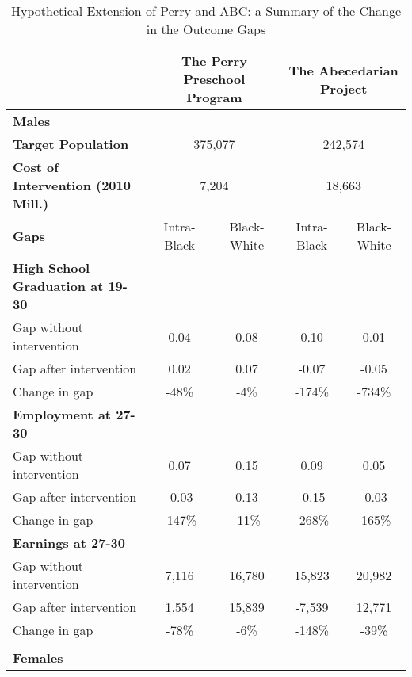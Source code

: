 \begin{table}[htbp]
\caption{\label{tab:summary} Hypothetical Extension of Perry and ABC: a Summary of the Change in the Outcome Gaps}\medskip
\footnotesize  \begin{center} \begin{tabular}{lcccc}  \hline \hline    
\textbf{ } &\multicolumn{2}{c}{The Perry Preschool Program} &\multicolumn{2}{c}{The Abecedarian Project}  \\[0.1cm]  \hline 
 \textbf{Males} & & & &  \\[0.1cm]  
\textbf{Target Population} &\multicolumn{2}{c}{     375,077} &\multicolumn{2}{c}{     242,574}  \\[0.1cm]  
\textbf{Cost of Intervention (2010 Mill.)} &\multicolumn{2}{c}{       7,204} &\multicolumn{2}{c}{      18,663}  \\[0.1cm]  
\textbf{Gaps}&Intra-Black &Black-White &Intra-Black &Black-White  \\[0.1cm] \textbf{ High School Graduation at 19-30} &&&& \\[0.02cm]  
 Gap without intervention &        0.04&        0.08&        0.10&        0.01 \\[0.02cm]   Gap after intervention &        0.02&        0.07&       -0.07&       -0.05 \\[0.02cm]   Change in gap &         -48\%&          -4\%&        -174\%&        -734\% \\[0.1cm]  \textbf{ Employment at 27-30} &&&& \\[0.02cm]  
 Gap without intervention &        0.07&        0.15&        0.09&        0.05 \\[0.02cm]   Gap after intervention &       -0.03&        0.13&       -0.15&       -0.03 \\[0.02cm]   Change in gap &        -147\%&         -11\%&        -268\%&        -165\% \\[0.1cm]  \textbf{ Earnings at 27-30} &&&& \\[0.02cm]  
 Gap without intervention &       7,116&      16,780&      15,823&      20,982 \\[0.02cm]   Gap after intervention &       1,554&      15,839&      -7,539&      12,771 \\[0.02cm]   Change in gap &         -78\%&          -6\%&        -148\%&         -39\% \\[0.1cm]   \\[0.2cm]  \hline 
 \textbf{Females} & & & &  \\[0.1cm]  

\end{tabular}
\end{center}
\end{table}
